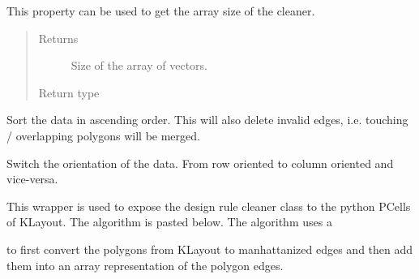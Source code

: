 \documentclass[a4paper,10pt,english]{sphinxmanual}
\begin{document}
\begin{fulllineitems}
\begin{fulllineitems}
\label{\detokenize{drc/drc:kppc.drc.kppc.drc.slcleaner.PyDrcSl.s}}
This property can be used to get the array size of the cleaner.
\begin{quote}\begin{description}
\item[{Returns}] \leavevmode
Size of the array of vectors.

\item[{Return type}] \leavevmode
{}%
\begin{footnote}[20]\sphinxAtStartFootnote
{}
%
\end{footnote}

\end{description}\end{quote}

\end{fulllineitems}


\begin{fulllineitems}
\label{\detokenize{drc/drc:kppc.drc.kppc.drc.slcleaner.PyDrcSl.sort}}
Sort the data in ascending order. This will also delete invalid edges, i.e. touching / overlapping polygons will be merged.

\end{fulllineitems}


\begin{fulllineitems}
\label{\detokenize{drc/drc:kppc.drc.kppc.drc.slcleaner.PyDrcSl.switch_dimensions}}
Switch the orientation of the data. From row oriented to column oriented and vice-versa.

\end{fulllineitems}


\end{fulllineitems}


This wrapper is used to expose the design rule cleaner class to the python PCells of KLayout.
The algorithm is pasted below. The algorithm uses a %
\begin{footnote}[21]\sphinxAtStartFootnote
{}
%
\end{footnote}
to first convert the polygons from KLayout to manhattanized edges and then add them into an array representation
of the polygon edges.
\end{document}
